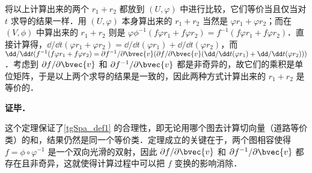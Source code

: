 将以上计算出来的两个 $r_1+r_2$ 都放到 $(U, \varphi)$ 中进行比较，它们等价当且仅当对 $t$ 求导的结果一样．用 $(U, \varphi)$ 本身算出来的 $r_1+r_2$ 当然是 $\varphi r_1+\varphi r_2$；而在 $(V, \phi)$ 中算出来的 $r_1+r_2$ 则是 $\varphi\phi^{-1}(f\varphi r_1+f\varphi r_2)=f^{-1}(f\varphi r_1+f\varphi r_2)$．直接计算得，$\dd/\dd t(\varphi r_1+\varphi r_2)=\dd/\dd t(\varphi r_1)+\dd/\dd t(\varphi r_2)$，而 $\dd/\dd t(f^{-1}(f\varphi r_1+f\varphi r_2)=\partial f^{-1}/\partial\bvec{v}(\partial f/\partial\bvec{v}(\dd/\dd t(\varphi r_1)+\dd/\dd t(\varphi r_2)))$．考虑到 $\partial f/\partial\bvec{v}$ 和 $\partial f^{-1}/\partial\bvec{v}$ 都是非奇异的，故它们的乘积是单位矩阵，于是以上两个求导的结果是一致的，因此两种方式计算出来的 $r_1+r_2$ 是等价的．

\textbf{证毕．}

这个定理保证了\autoref{tgSpa_def1} 的合理性，即无论用哪个图去计算切向量（道路等价类）的和，结果仍然是同一个等价类．定理成立的关键在于，两个图相容使得 $f=\phi\circ\varphi^{-1}$ 是一个双向光滑的双射，因此 $\partial f/\partial\bvec{v}$ 和 $\partial f^{-1}/\partial\bvec{v}$ 都存在且非奇异，这就使得计算过程中可以把 $f$ 变换的影响消除．





